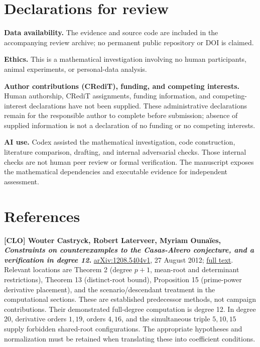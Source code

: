 \documentclass[
  british,
  10pt,
]{article}
\begin{document}
\section{Declarations for review}\label{declarations-for-review}

\textbf{Data availability.} The evidence and source code are included in
the accompanying review archive; no permanent public repository or DOI
is claimed.

\textbf{Ethics.} This is a mathematical investigation involving no human
participants, animal experiments, or personal-data analysis.

\textbf{Author contributions (CRediT), funding, and competing
interests.} Human authorship, CRediT assignments, funding information,
and competing-interest declarations have not been supplied. These
administrative declarations remain for the responsible author to
complete before submission; absence of supplied information is not a
declaration of no funding or no competing interests.

\textbf{AI use.} Codex assisted the mathematical investigation, code
construction, literature comparison, drafting, and internal adversarial
checks. Those internal checks are not human peer review or formal
verification. The manuscript exposes the mathematical dependencies and
executable evidence for independent assessment.

\section{References}\label{references}

\textbf{{[}CLO{]} Wouter Castryck, Robert Laterveer, Myriam Ounaïes,
\emph{Constraints on counterexamples to the Casas-Alvero conjecture, and
a verification in degree 12}.}
\href{https://arxiv.org/abs/1208.5404v1}{arXiv:1208.5404v1}, 27 August
2012; \href{https://arxiv.org/html/1208.5404}{full text}. Relevant
locations are Theorem 2 (degree \(p+1\), mean-root and determinant
restrictions), Theorem 13 (distinct-root bound), Proposition 15
(prime-power derivative placement), and the scenario/descendant
treatment in the computational sections. These are established
predecessor methods, not campaign contributions. Their demonstrated
full-degree computation is degree 12. In degree 20, derivative orders
\(1,19\), orders \(4,16\), and the simultaneous triple \(5,10,15\)
supply forbidden shared-root configurations. The appropriate hypotheses
and normalization must be retained when translating these into
coefficient conditions.
\end{document}
